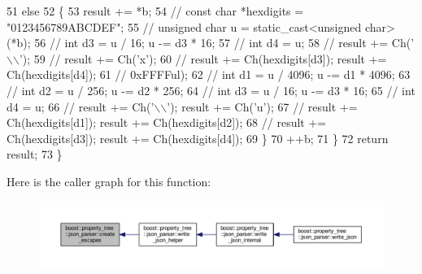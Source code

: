 \begin{DoxyCode}
51     \textcolor{keywordflow}{else}
52     \{
53       result += *b;
54       \textcolor{comment}{// const char *hexdigits = "0123456789ABCDEF";}
55       \textcolor{comment}{// unsigned char u = static\_cast<unsigned char>(*b);}
56       \textcolor{comment}{// int d3 = u / 16; u -= d3 * 16;}
57       \textcolor{comment}{// int d4 = u;}
58       \textcolor{comment}{// result += Ch('\(\backslash\)\(\backslash\)');}
59       \textcolor{comment}{// result += Ch('x');}
60       \textcolor{comment}{// result += Ch(hexdigits[d3]); result += Ch(hexdigits[d4]);}
61       \textcolor{comment}{//                              0xFFFFul);}
62       \textcolor{comment}{// int d1 = u / 4096; u -= d1 * 4096;}
63       \textcolor{comment}{// int d2 = u / 256; u -= d2 * 256;}
64       \textcolor{comment}{// int d3 = u / 16; u -= d3 * 16;}
65       \textcolor{comment}{// int d4 = u;}
66       \textcolor{comment}{// result += Ch('\(\backslash\)\(\backslash\)'); result += Ch('u');}
67       \textcolor{comment}{// result += Ch(hexdigits[d1]); result += Ch(hexdigits[d2]);}
68       \textcolor{comment}{// result += Ch(hexdigits[d3]); result += Ch(hexdigits[d4]);}
69     \}
70     ++b;
71   \}
72   \textcolor{keywordflow}{return} result;
73 \}
\end{DoxyCode}


Here is the caller graph for this function\-:
\nopagebreak
\begin{figure}[H]
\begin{center}
\leavevmode
\includegraphics[width=350pt]{namespaceboost_1_1property__tree_1_1json__parser_a747e92e137769eb6b27edb76d613f37a_icgraph}
\end{center}
\end{figure}


